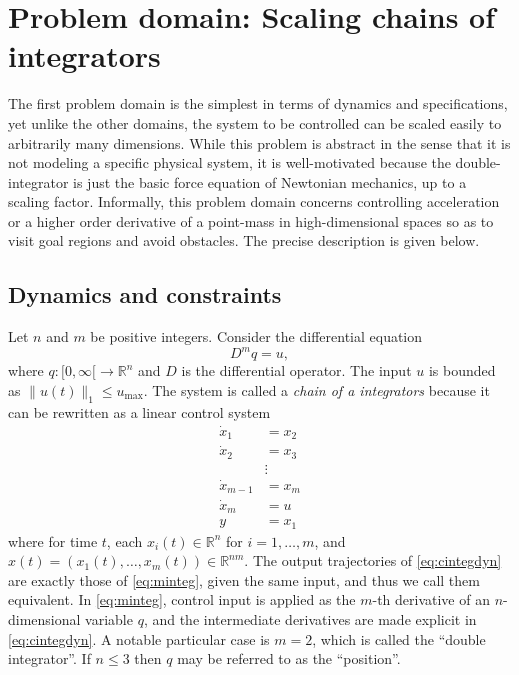 \documentclass{amsart}
\theoremstyle{definition}
\begin{document}
\section{Problem domain: Scaling chains of integrators}\label{sec:scalingcinteg}

The first problem domain is the simplest in terms of dynamics and
specifications, yet unlike the other domains, the system to be controlled can be
scaled easily to arbitrarily many dimensions.  While this problem is abstract in
the sense that it is not modeling a specific physical system, it is
well-motivated because the double-integrator is just the basic force equation of
Newtonian mechanics, up to a scaling factor.  Informally, this problem domain
concerns controlling acceleration or a higher order derivative of a point-mass
in high-dimensional spaces so as to visit goal regions and avoid obstacles.  The
precise description is given below.

\subsection{Dynamics and constraints}

Let $n$ and $m$ be positive integers.  Consider the differential equation
\begin{equation}\label{eq:minteg}
D^{m}q = u ,
\end{equation}
where $q: [0,\infty [ \rightarrow \mathbb{R}^{n}$ and $D$ is the differential
operator.  The input $u$ is bounded as $\lVert u(t) \rVert_1 \leq
u_{\mathrm{max}}$.  The system is called a \textit{chain of a integrators}
because it can be rewritten as a linear control system
\begin{equation}\label{eq:cintegdyn}
\begin{split}
\dot{x}_1 &= x_2 \\
\dot{x}_2 &= x_3 \\
&\vdots \\
\dot{x}_{m-1} &= x_m \\
\dot{x}_m &= u \\
y &= x_1
\end{split}
\end{equation}
where for time $t$, each $x_{i}(t)\in \mathbb{R}^n$ for $i=1,\ldots,m$, and
$x(t)=\left( x_{1}(t) , \ldots , x_{m}(t)\right)\in \mathbb{R}^{nm}$. The output
trajectories of \eqref{eq:cintegdyn} are exactly those of \eqref{eq:minteg},
given the same input, and thus we call them equivalent. In \eqref{eq:minteg},
control input is applied as the $m$-th derivative of an $n$-dimensional variable
$q$, and the intermediate derivatives are made explicit in
\eqref{eq:cintegdyn}. A notable particular case is $m=2$, which is called the
``double integrator''. If $n \leq 3$ then $q$ may be referred to as the
``position''.
\end{document}
